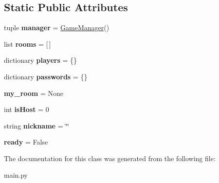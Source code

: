 \subsection*{Static Public Attributes}
\begin{DoxyCompactItemize}
\item 
\hypertarget{classcards-with-friends_1_1main_1_1_card_namespace_a083dcb4c4505532ff93faa66a868fb8d}{tuple {\bfseries manager} = \hyperlink{classcards-with-friends_1_1main_1_1_game_manager}{Game\-Manager}()}\label{classcards-with-friends_1_1main_1_1_card_namespace_a083dcb4c4505532ff93faa66a868fb8d}

\item 
\hypertarget{classcards-with-friends_1_1main_1_1_card_namespace_a3c4e4bc0569cefec5817e2625bb86904}{list {\bfseries rooms} = \mbox{[}$\,$\mbox{]}}\label{classcards-with-friends_1_1main_1_1_card_namespace_a3c4e4bc0569cefec5817e2625bb86904}

\item 
\hypertarget{classcards-with-friends_1_1main_1_1_card_namespace_a3f0ffb585b5f79ddd7a8ca6b047515a2}{dictionary {\bfseries players} = \{\}}\label{classcards-with-friends_1_1main_1_1_card_namespace_a3f0ffb585b5f79ddd7a8ca6b047515a2}

\item 
\hypertarget{classcards-with-friends_1_1main_1_1_card_namespace_a32391e63766cbbe2df5972290b3c564b}{dictionary {\bfseries passwords} = \{\}}\label{classcards-with-friends_1_1main_1_1_card_namespace_a32391e63766cbbe2df5972290b3c564b}

\item 
\hypertarget{classcards-with-friends_1_1main_1_1_card_namespace_afea92ae3214ca41ea335937926537fdb}{{\bfseries my\-\_\-room} = None}\label{classcards-with-friends_1_1main_1_1_card_namespace_afea92ae3214ca41ea335937926537fdb}

\item 
\hypertarget{classcards-with-friends_1_1main_1_1_card_namespace_a3e30c3a845a6fdc206db38e4e237d859}{int {\bfseries is\-Host} = 0}\label{classcards-with-friends_1_1main_1_1_card_namespace_a3e30c3a845a6fdc206db38e4e237d859}

\item 
\hypertarget{classcards-with-friends_1_1main_1_1_card_namespace_a55611ac97e973922a06f1ff813c74745}{string {\bfseries nickname} = \char`\"{}\char`\"{}}\label{classcards-with-friends_1_1main_1_1_card_namespace_a55611ac97e973922a06f1ff813c74745}

\item 
\hypertarget{classcards-with-friends_1_1main_1_1_card_namespace_a79b6d468dae49167cc9b841ee8380310}{{\bfseries ready} = False}\label{classcards-with-friends_1_1main_1_1_card_namespace_a79b6d468dae49167cc9b841ee8380310}

\end{DoxyCompactItemize}


The documentation for this class was generated from the following file\-:\begin{DoxyCompactItemize}
\item 
main.\-py\end{DoxyCompactItemize}
